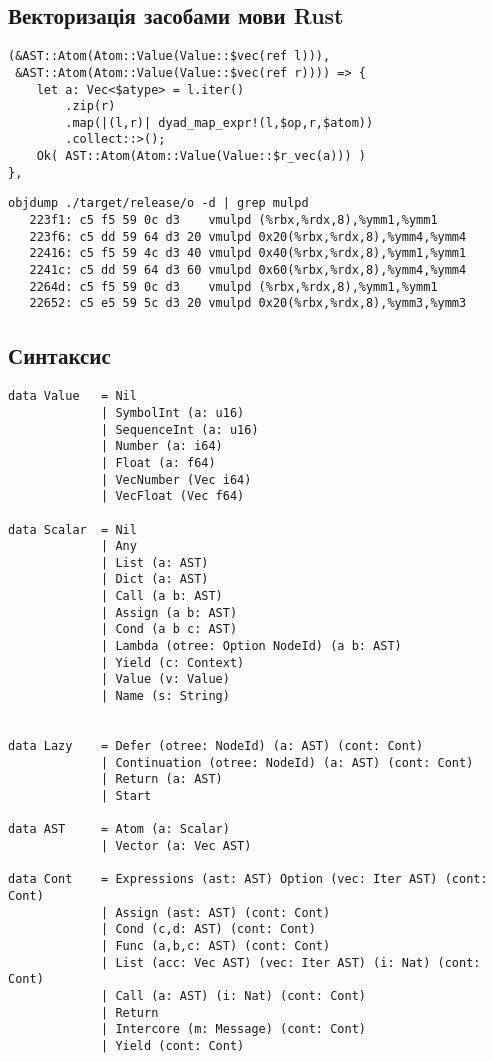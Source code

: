 \subsection{Векторизація засобами мови Rust}

\begin{lstlisting}
(&AST::Atom(Atom::Value(Value::$vec(ref l))),
 &AST::Atom(Atom::Value(Value::$vec(ref r)))) => {
    let a: Vec<$atype> = l.iter()
        .zip(r)
        .map(|(l,r)| dyad_map_expr!(l,$op,r,$atom))
        .collect::>();
    Ok( AST::Atom(Atom::Value(Value::$r_vec(a))) )
},
\end{lstlisting}

\begin{lstlisting}
objdump ./target/release/o -d | grep mulpd
   223f1: c5 f5 59 0c d3    vmulpd (%rbx,%rdx,8),%ymm1,%ymm1
   223f6: c5 dd 59 64 d3 20 vmulpd 0x20(%rbx,%rdx,8),%ymm4,%ymm4
   22416: c5 f5 59 4c d3 40 vmulpd 0x40(%rbx,%rdx,8),%ymm1,%ymm1
   2241c: c5 dd 59 64 d3 60 vmulpd 0x60(%rbx,%rdx,8),%ymm4,%ymm4
   2264d: c5 f5 59 0c d3    vmulpd (%rbx,%rdx,8),%ymm1,%ymm1
   22652: c5 e5 59 5c d3 20 vmulpd 0x20(%rbx,%rdx,8),%ymm3,%ymm3
\end{lstlisting}

\subsection{Синтаксис}

\begin{lstlisting}
data Value   = Nil
             | SymbolInt (a: u16)
             | SequenceInt (a: u16)
             | Number (a: i64)
             | Float (a: f64)
             | VecNumber (Vec i64)
             | VecFloat (Vec f64)

data Scalar  = Nil
             | Any
             | List (a: AST)
             | Dict (a: AST)
             | Call (a b: AST)
             | Assign (a b: AST)
             | Cond (a b c: AST)
             | Lambda (otree: Option NodeId) (a b: AST)
             | Yield (c: Context)
             | Value (v: Value)
             | Name (s: String)


data Lazy    = Defer (otree: NodeId) (a: AST) (cont: Cont)
             | Continuation (otree: NodeId) (a: AST) (cont: Cont)
             | Return (a: AST)
             | Start

data AST     = Atom (a: Scalar)
             | Vector (a: Vec AST)

data Cont    = Expressions (ast: AST) Option (vec: Iter AST) (cont: Cont)
             | Assign (ast: AST) (cont: Cont)
             | Cond (c,d: AST) (cont: Cont)
             | Func (a,b,c: AST) (cont: Cont)
             | List (acc: Vec AST) (vec: Iter AST) (i: Nat) (cont: Cont)
             | Call (a: AST) (i: Nat) (cont: Cont)
             | Return
             | Intercore (m: Message) (cont: Cont)
             | Yield (cont: Cont)
\end{lstlisting}


